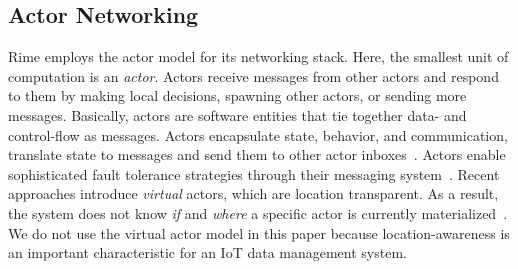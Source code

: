 \subsection{Actor Networking} 
\label{subsec::actor}
Rime employs the actor model for its networking stack. Here, the smallest unit of computation is an \textit{actor}. 
Actors receive messages from other actors and respond to them by making local decisions, spawning other actors, or sending more messages.
Basically, actors are software entities that tie together 
data- and control-flow as messages. 
Actors encapsulate state, behavior, 
and communication, translate state to messages and send them to other actor inboxes~\cite{hewitt1973session}.
Actors enable sophisticated fault tolerance strategies through their messaging system~\cite{charousset_native_2013}.
% 
Recent approaches introduce \textit{virtual} actors, which are location transparent.
As a result, the system does not know \textit{if} and \textit{where} a specific actor is currently materialized~\cite{bernstein2014orleans}. 
We do not use the virtual actor model in this paper because location-awareness is an important characteristic for an IoT data management system.
